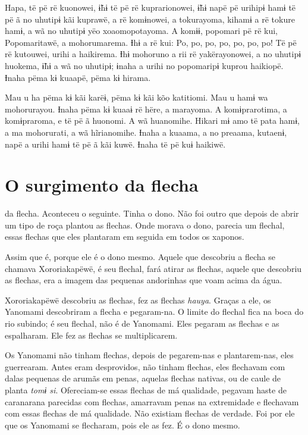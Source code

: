 Hapa, të pë rë kuonowei, ɨ̃hɨ të pë rë kuprarionowei, ɨ̃hɨ napë pë urihipɨ
hamɨ të pë ã no uhutipɨ kãi kuprawë, a rë komɨnowei, a tokurayoma,
kihamɨ a rë tokure hamɨ, a wã no uhutipɨ yëo xoaomopotayoma. A komɨɨ,
popomari pë rë kui, Popomaritawë, a mohorumarema. Ɨhɨ a rë kui: Po, po,
po, po, po, po, po! Të pë rë kutouwei, urihi a haikirema. Ɨhɨ mohoruno a
rii rë yakërayonowei, a no uhutipɨ huokema, ɨ̃hɨ a wã no uhutipɨ; ɨnaha a
urihi no popomaripɨ kuprou haikiopë. Ɨnaha pëma kɨ kuaapë, pëma kɨ
hirama. 

Mau u ha pëma kɨ kãi karëɨ, pëma kɨ kãi kõo katitiomi. Mau u hamɨ wa
mohorurayou. Ɨnaha pëma kɨ kuaaɨ rë hëre, a marayoma. A komɨprarotima, a
komɨpraroma, e të pë ã huonomi. A wã huanomihe. Hikari mɨ amo të pata
hamɨ, a ma mohorurati, a wã hĩrianomihe. Ɨnaha a kuaama, a no preaama,
kutaenɨ, napë a urihi hamɨ të pë ã kãi kuwë. Ɨnaha të pë kuɨ haikiwë.

\chapter{O surgimento da flecha}

 da flecha. Aconteceu o seguinte. Tinha o dono. Não foi outro
que depois de abrir um tipo de roça plantou as flechas. Onde morava o
dono, parecia um flechal, essas flechas que eles plantaram em seguida em
todos os xaponos.

Assim que é, porque ele é o dono mesmo. Aquele que descobriu a flecha se
chamava Xororiakapëwë, é seu flechal, fará atirar as flechas, aquele que
descobriu as flechas, era a imagem das pequenas andorinhas que voam
acima da água. 

Xororiakapëwë descobriu as flechas, fez as flechas \textit{hauya}. Graças
a ele, os Yanomami descobriram a flecha e pegaram-na. O limite do
flechal fica na boca do rio subindo; é seu flechal, não é de Yanomami.
Eles pegaram as flechas e as espalharam. Ele fez as flechas se
multiplicarem. 

Os Yanomami não tinham flechas, depois de pegarem-nas e plantarem-nas,
eles guerrearam. Antes eram desprovidos, não tinham flechas, eles
flechavam com dalas pequenas de arumãs em penas, aquelas flechas nativas,
ou de caule de planta \textit{tomɨ si}. Ofereciam-se essas flechas de má
qualidade, pegavam haste de caranarana parecidas com flechas, amarravam
penas na extremidade e flechavam com essas flechas de má qualidade. Não
existiam flechas de verdade. Foi por ele que os Yanomami se flecharam,
pois ele as fez. É o dono mesmo. 

